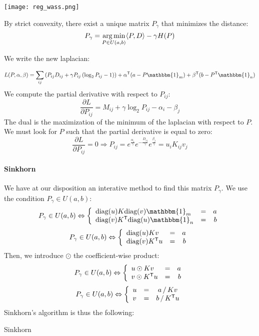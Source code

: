 \begin{center}
	\texttt{[image: reg\_wass.png]}
\end{center}

By strict convexity, there exist a unique matrix $P_\gamma$ that minimizes the distance:
$$ P_\gamma = \operatorname*{arg\,min}_{P \in U(a, b)} \langle P, D \rangle - \gamma H(P) $$


\dem

We write the new laplacian:

$$ L(P, \alpha, \beta) = \sum_{ij} \left( P_{ij} D_{ij} + \gamma P_{ij} \left( \log_2 P_{ij} - 1 \right) \right) + \alpha^\trans (a - P \mathbbm{1}_m) + \beta^\trans (b - P^\trans \mathbbm{1}_n) $$
We compute the partial derivative with respect to $P_{ij}$:
$$ \dfrac{\partial L}{\partial P_{ij}} = M_{ij} + \gamma \log_2 P_{ij} - \alpha_i - \beta_j $$
The dual is the maximization of the minimum of the laplacian with respect
to $P$. We must look for $P$ such that the partial derivative is equal to zero:
$$ \dfrac{\partial L}{\partial P_{ij}} = 0 \Rightarrow P_{ij} = e^{\frac{\alpha_i}{\gamma}} e^{-\frac{D_{ij}}{\gamma}}  e^{\frac{\beta_j}{\gamma}} = u_i K_{ij} v_j $$
\findem

\paragraph{Sinkhorn}
We have at our disposition an interative method to find this matrix $P_\gamma$. We use the condition $P_\gamma \in U(a,b)$:
$$ P_\gamma \in U(a, b) \Leftrightarrow \left\{ \begin{array}{lrr}
\text{diag}(u) K \text{diag}(v) \mathbbm{1}_m & = & a \\
\text{diag}(v) K^\trans \text{diag}(u) \mathbbm{1}_n & = & b
\end{array} \right. $$
$$ P_\gamma \in U(a, b) \Leftrightarrow \left\{ \begin{array}{lrr}
\text{diag}(u) K v & = & a \\
\text{diag}(v) K^{\mathsf{T}} u & = & b
\end{array} \right. $$
Then, we introduce $\odot$ the coefficient-wise product:
$$ P_\gamma \in U(a, b) \Leftrightarrow \left\{ \begin{array}{lrr}
u \odot K v & = & a \\
v \odot K^{\mathsf{T}} u & = & b
\end{array} \right. $$
$$ P_\gamma \in U(a, b) \Leftrightarrow \left\{ \begin{array}{lrc}
u & = & a \, / \, K v \\
v & = & b \, / \, K^{\mathsf{T}} u
\end{array} \right. $$
Sinkhorn's algorithm is thus the following: \\
\begin{algorithm}[H]
	\caption{Sinkhorn}
\end{algorithm}

